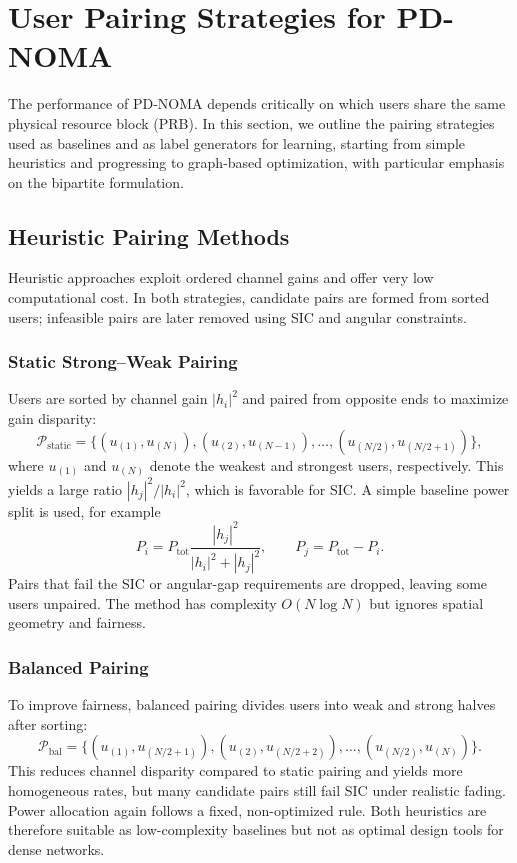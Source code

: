 \section{User Pairing Strategies for PD-NOMA}
\label{sec:pairing-strategies}

The performance of PD-NOMA depends critically on which users share the same physical resource block (PRB). In this section, we outline the pairing strategies used as baselines and as label generators for learning, starting from simple heuristics and progressing to graph-based optimization, with particular emphasis on the bipartite formulation.

\subsection{Heuristic Pairing Methods}

Heuristic approaches exploit ordered channel gains and offer very low computational cost. In both strategies, candidate pairs are formed from sorted users; infeasible pairs are later removed using SIC and angular constraints.

\subsubsection{Static Strong–Weak Pairing}

Users are sorted by channel gain $|h_i|^2$ and paired from opposite ends to maximize gain disparity:
\begin{equation}
\mathcal{P}_{\text{static}}
=\{(u_{(1)},u_{(N)}), (u_{(2)},u_{(N-1)}), \ldots, (u_{(N/2)},u_{(N/2+1)})\},
\end{equation}
where $u_{(1)}$ and $u_{(N)}$ denote the weakest and strongest users, respectively. This yields a large ratio $|h_j|^2/|h_i|^2$, which is favorable for SIC. A simple baseline power split is used, for example
\[
P_i = P_{\mathrm{tot}} \frac{|h_j|^2}{|h_i|^2 + |h_j|^2}, \qquad
P_j = P_{\mathrm{tot}} - P_i.
\]
Pairs that fail the SIC or angular-gap requirements are dropped, leaving some users unpaired. The method has complexity $O(N \log N)$ but ignores spatial geometry and fairness.

\subsubsection{Balanced Pairing}

To improve fairness, balanced pairing divides users into weak and strong halves after sorting:
\begin{equation}
\mathcal{P}_{\text{bal}}
=\{(u_{(1)},u_{(N/2+1)}), (u_{(2)},u_{(N/2+2)}), \ldots, (u_{(N/2)},u_{(N)})\}.
\end{equation}
This reduces channel disparity compared to static pairing and yields more homogeneous rates, but many candidate pairs still fail SIC under realistic fading. Power allocation again follows a fixed, non-optimized rule. Both heuristics are therefore suitable as low-complexity baselines but not as optimal design tools for dense networks.

